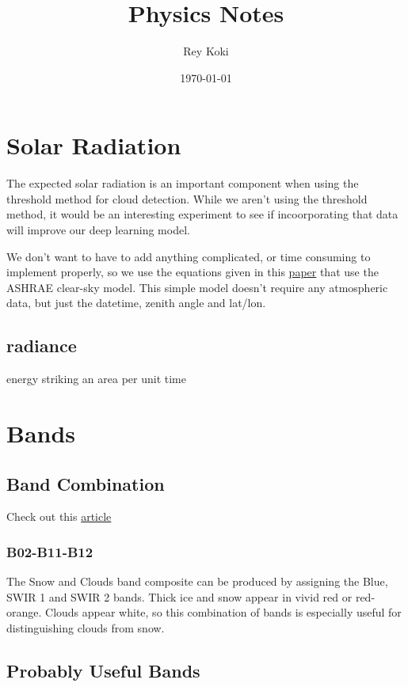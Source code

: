 \documentclass[10pt]{article}
\title{Physics Notes}
\author{Rey Koki}
\date{\today}
\begin{document}
\maketitle \tableofcontents

\section{Solar Radiation}

The expected solar radiation is an important component when using the threshold method for cloud detection. While we aren't using the threshold method, it would be an interesting experiment to see if incoorporating that data will improve our deep learning model.

We don't want to have to add anything complicated, or time consuming to implement properly, so we use the equations given in this \href{https://github.com/reykoki/Throwing-Shade/blob/main/notes/ASHRAE_paper.pdf}{paper} that use the ASHRAE clear-sky model. This simple model doesn't require any atmospheric data, but just the datetime, zenith angle and lat/lon.


\subsection{radiance}
energy striking an area per unit time

\section{Bands}

\subsection{Band Combination}
Check out this \href{https://www.staridasgeography.gr/how-to-make-outstanding-maps-with-sentinel-2-and-arcgis-pro-part-1-band-combinations/}{article}
\subsubsection{B02-B11-B12}
The Snow and Clouds band composite can be produced by assigning the Blue, SWIR 1 and SWIR 2 bands. Thick ice and snow appear in vivid red or red-orange. Clouds appear white, so this combination of bands is especially useful for distinguishing clouds from snow.

\subsection{Probably Useful Bands}
\end{document}
